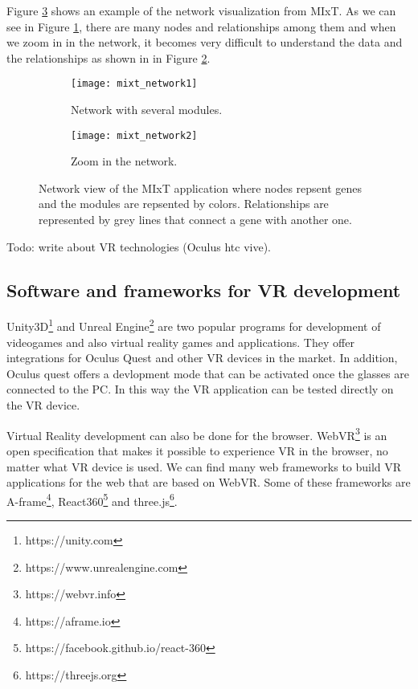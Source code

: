 Figure \ref{fig:mixt_network} shows an example of the network visualization from MIxT. As we can see in Figure \ref{fig:mixt_network1}, there are many nodes and relationships among them and when we zoom in in the network, it becomes very difficult to understand the data and the relationships as shown in in Figure \ref{fig:mixt_network_zoom}.

\begin{figure}[h!]
    \centering%
    \begin{subfigure}[t]{0.5\textwidth}
        \centering%
        \texttt{[image: mixt\_network1]}
        \caption{Network with several modules.}
        \label{fig:mixt_network1}
    \end{subfigure}%
    \begin{subfigure}[t]{0.5\textwidth}
        \centering%
        \texttt{[image: mixt\_network2]}
        \caption{Zoom in the network.}
        \label{fig:mixt_network_zoom}
    \end{subfigure}

    \caption{Network view of the MIxT application where nodes repsent genes and the modules are repsented by colors. Relationships are represented by grey lines that connect a gene with another one.}
    \label{fig:mixt_network}
\end{figure}

Todo: write about VR technologies (Oculus htc vive).

\subsection{Software and frameworks for VR development}
Unity3D\footnote{https://unity.com} and Unreal Engine\footnote{https://www.unrealengine.com} are two popular programs for development of videogames and also virtual reality games and applications. They offer integrations for Oculus Quest and other VR devices in the market. In addition, Oculus quest offers a devlopment mode that can be activated once the glasses are connected to the PC. In this way the VR application can be tested directly on the VR device.

Virtual Reality development can also be done for the browser. WebVR\footnote{https://webvr.info} is an open specification that makes it possible to experience VR in the browser, no matter what VR device is used. We can find many web frameworks to build VR applications for the web that are based on WebVR. Some of these frameworks are A-frame\footnote{https://aframe.io}, React360\footnote{https://facebook.github.io/react-360} and three.js\footnote{https://threejs.org}.

